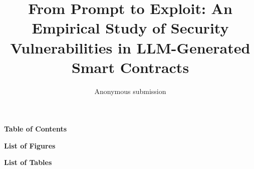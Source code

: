 \documentclass[conference]{IEEEtran}
\begin{document}
\title{From Prompt to Exploit: An Empirical Study of Security Vulnerabilities in LLM-Generated Smart Contracts}

\author{Anonymous submission}

\begin{titlepage}
\centering
\vspace*{0.6cm}
{\Large\bfseries Table of Contents\\[0.55cm]}
\begin{minipage}{0.9\textwidth}
\small
\setcounter{tocdepth}{2}
\renewcommand{\contentsname}{}
{\renewcommand{\baselinestretch}{1.35}\selectfont
\tableofcontents\par}
\end{minipage}

\vspace{1.4cm}
{\large\bfseries List of Figures\\[0.45cm]}
\begin{minipage}{0.9\textwidth}
\small
\renewcommand{\listfigurename}{}
{\renewcommand{\baselinestretch}{1.3}\selectfont
\listoffigures\par}
\end{minipage}

\vspace{1.4cm}
{\large\bfseries List of Tables\\[0.45cm]}
\begin{minipage}{0.9\textwidth}
\small
\renewcommand{\listtablename}{}
{\renewcommand{\baselinestretch}{1.3}\selectfont
\listoftables\par}
\end{minipage}
\end{titlepage}

\maketitle






















\balance

\appendices


\end{document}
